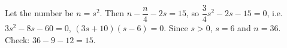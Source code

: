 Let the number be $n=s^2$. Then $n-\dfrac n4-2s=15$, so $\dfrac34s^2-2s-15=0$, i.e. $3s^2-8s-60=0$, $(3s+10)(s-6)=0$. Since $s>0$, $s=6$ and $n=\boxed{36}$. Check: $36-9-12=15$.
